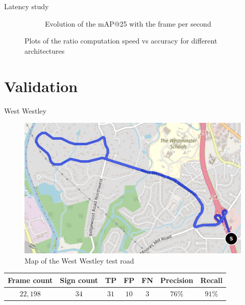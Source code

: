 \documentclass{beamer}
\begin{document}
\begin{frame}{Latency study}
\begin{figure}
\begin{center}
\begin{subfigure}[t]{.49\linewidth}
          \caption{Evolution of the mAP@25 with the frame per second}
        \end{subfigure}
        \caption{Plots of the ratio computation speed vs accuracy for different architectures}
        \label{fig:map_to_speed}
      \end{center}
    \end{figure}
\end{frame}{}



\section{Validation}
\begin{frame}{West Westley}
    \begin{figure}
        \centering
        \includegraphics[width=0.6\linewidth]{figures/westwestleymap.png}
        \caption{Map of the West Westley test road}
        \label{fig:wwmap}
    \end{figure}{}
    \small
    \begin{table}[]
        \centering
        \begin{tabular}{|c|c|c|c|c|c|c|}
            \hline
            Frame count & Sign count & TP & FP & FN & Precision & Recall \\ \hline
            $22,198$ & $34$ & $31$ & $10$ & $3$ & $76\%$ & $91\%$ \\ \hline
        \end{tabular}
        \label{tab:ww_numbers}
    \end{table}{}
\end{frame}{}
\end{document}
